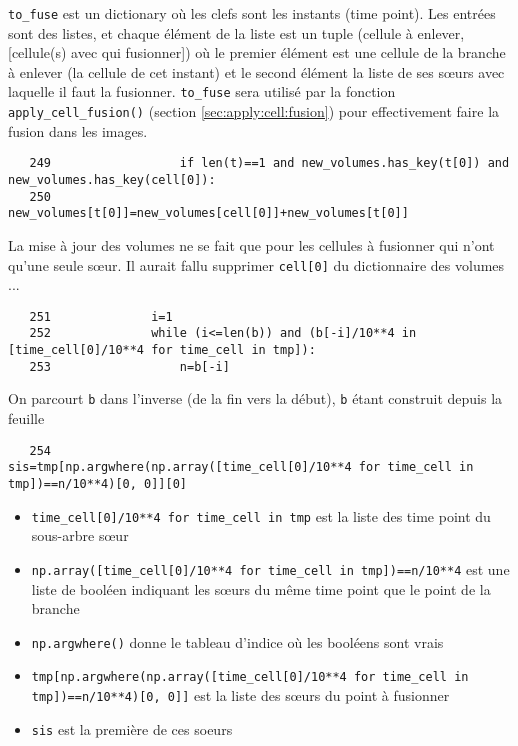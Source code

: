 \documentclass{article}
\def \mycolor {red}
\begin{document}
\color{\mycolor}
\verb|to_fuse| est un dictionary o\`u les clefs sont les instants (time point). Les entr\'ees sont des listes, et chaque \'el\'ement de la liste est un tuple (cellule \`a enlever, [cellule(s) avec qui fusionner]) o\`u le premier \'el\'ement est une cellule de la branche \`a enlever (la cellule de cet instant) et le second \'el\'ement la liste de ses s{\oe}urs avec laquelle il faut la fusionner. \verb|to_fuse| sera utilis\'e par la fonction \verb|apply_cell_fusion()| (section \ref{sec:apply:cell:fusion}) pour effectivement faire la fusion dans les images.
\color{black}
\begin{verbatim}
   249	                if len(t)==1 and new_volumes.has_key(t[0]) and new_volumes.has_key(cell[0]):
   250	                    new_volumes[t[0]]=new_volumes[cell[0]]+new_volumes[t[0]]
\end{verbatim} 
\color{\mycolor}
La mise \`a jour des volumes ne se fait que pour les cellules \`a fusionner qui n'ont qu'une seule s{\oe}ur. Il aurait fallu supprimer \verb|cell[0]| du dictionnaire des volumes ...
\color{black}
\begin{verbatim}
   251	            i=1
   252	            while (i<=len(b)) and (b[-i]/10**4 in [time_cell[0]/10**4 for time_cell in tmp]):
   253	                n=b[-i]
\end{verbatim} 
\color{\mycolor}
On parcourt \verb|b| dans l'inverse (de la fin vers la d\'ebut), \verb|b| \'etant construit depuis la feuille
\color{black}
\begin{verbatim}
   254	                sis=tmp[np.argwhere(np.array([time_cell[0]/10**4 for time_cell in tmp])==n/10**4)[0, 0]][0]
\end{verbatim} 
\color{\mycolor}
\begin{itemize}
\item \verb|time_cell[0]/10**4 for time_cell in tmp| est la liste des time point du sous-arbre s{\oe}ur
\item \verb|np.array([time_cell[0]/10**4 for time_cell in tmp])==n/10**4| est une liste de bool\'een indiquant les s{\oe}urs du m\^eme time point que le point de la branche
\item \verb|np.argwhere()| donne le tableau d'indice o\`u les bool\'eens sont vrais
\item \verb|tmp[np.argwhere(np.array([time_cell[0]/10**4 for time_cell in tmp])==n/10**4)[0, 0]]| est la liste des s{\oe}urs du point \`a fusionner
\item \verb|sis| est la premi\`ere de ces soeurs 
\end{itemize}
\end{document}
